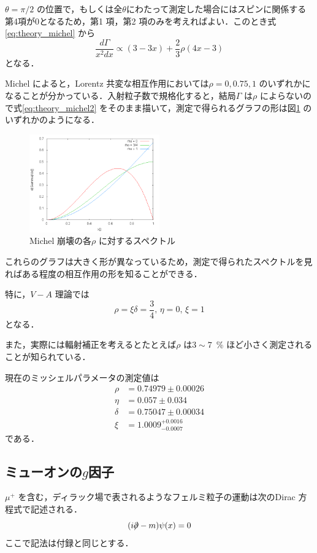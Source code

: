 $\theta = \pi/2$ の位置で，もしくは全$\theta$にわたって測定した場合にはスピンに関係する第4項が0となるため，第1 項，第2 項のみを考えればよい．このとき式\eqref{eq:theory_michel} から
\begin{equation}
\frac{d\Gamma}{x^{2}dx} \propto (3 - 3x) + \frac{2}{3}\rho (4x - 3)
\label{eq:theory_michel2}
\end{equation}
となる．

Michel \cite{michel_origin} によると，Lorentz 共変な相互作用においては$\rho = 0, 0.75, 1$ のいずれかになることが分かっている\cite{michel_interaction}．入射粒子数で規格化すると，結局$\Gamma$ は$\rho$ によらないので式\eqref{eq:theory_michel2} をそのまま描いて，測定で得られるグラフの形は図\ref{zu:michelpar} のいずれかのようになる．
\begin{figure}[htbp]
\centering
\includegraphics[width = 0.5\textwidth]{figure/abe/michelgraph.png}
\caption{Michel 崩壊の各$\rho$ に対するスペクトル}
\label{zu:michelpar}
\end{figure}
これらのグラフは大きく形が異なっているため，測定で得られたスペクトルを見ればある程度の相互作用の形を知ることができる．

特に，$V-A$ 理論では
\[ \rho = \xi\delta = \frac{3}{4},\, \eta = 0,\, \xi = 1 \]
となる．

また，実際には輻射補正を考えるとたとえば$\rho$ は$3 \sim 7$~\% ほど小さく測定されることが知られている．

現在のミッシェルパラメータの測定値は
\begin{align*}
\rho &= 0.74979 \pm 0.00026\\
\eta &= 0.057 \pm 0.034\\
\delta &= 0.75047 \pm 0.00034\\
\xi &= 1.0009^{+0.0016}_{-0.0007}
\end{align*}
である\cite{PDG}．
	
\subsection{ミューオンの$g$因子}
$\mu^{+}$ を含む，ディラック場で表されるようなフェルミ粒子の運動は次のDirac 方程式で記述される．
\begin{equation}
(i\Slash{\partial} - m)\psi(x) = 0
\label{eq:theory_dirac}
\end{equation}
ここで記法は付録と同じとする．

